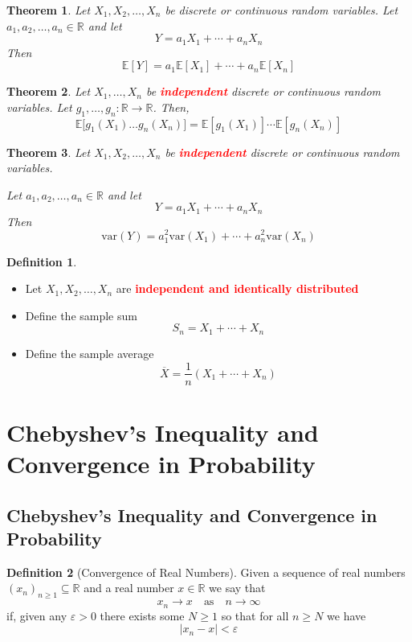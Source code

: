 \documentclass{article}
\newcommand{\R}{\mathbb{R}}
\newcommand{\E}{\mathbb{E}}
\newcommand{\var}{\text{var}}
\newcommand{\bfred}[1]{\textcolor{red}{\textbf{#1}}}
\theoremstyle{plain}
\newtheorem{thm}{Theorem}[section]
\theoremstyle{definition}
\newtheorem{defn}{Definition}[section]
\theoremstyle{remark}
\begin{document}
\begin{thm}
    Let $X_1,X_2,\dotsc,X_n$ be discrete or continuous random variables. Let $a_1,a_2,\dotsc,a_n\in\R$ and let \[Y=a_1X_1+\dotsb+a_nX_n\] Then \[\E[Y]=a_1\E[X_1]+\dotsb+a_n\E[X_n]\]
\end{thm}

\begin{thm}
    Let $X_1, \dotsc,X_n$ be \bfred{independent} discrete or continuous random variables. Let $g_1,\dotsc,g_n:\R\rightarrow\R$. Then, \[\E\bigr[g_1(X_1)\dotsc g_n(X_n)\bigr]=\E[g_1(X_1)]\dotsm\E[g_n(X_n)]\]
\end{thm}

\begin{thm}
    Let $X_1,X_2,\dotsc,X_n$ be \bfred{independent} discrete or continuous random variables. 
    
    \noindent Let $a_1, a_2,\dotsc, a_n\in\R$ and let \[Y=a_1X_1+\dotsb+a_nX_n\] Then \[\var(Y)=a_1^2\var(X_1)+\dotsb+a_n^2\var(X_n)\]
\end{thm}

\begin{defn}
    \begin{itemize}
        \item Let $X_1,X_2,\dotsc,X_n$ are \bfred{independent and identically distributed}
        \item Define the sample sum \[S_n=X_1+\dotsb+X_n\]
        \item Define the sample average \[\overline{X} = \frac{1}{n}(X_1+\dotsb+X_n)\]
    \end{itemize}
\end{defn}

\section{Chebyshev's Inequality and Convergence in Probability}

\subsection{Chebyshev's Inequality and Convergence in Probability}

\begin{defn}[Convergence of Real Numbers]
    Given a sequence of real numbers $(x_n)_{n\geq1}\subseteq\R$ and a real number $x\in\R$ we say that \[x_n\rightarrow x\quad\text{as}\quad n\rightarrow\infty\] if, given any $\varepsilon>0$ there exists some $N\geq1$ so that for all $n\geq N$ we have \[|x_n-x|<\varepsilon\]
\end{defn}
\end{document}
